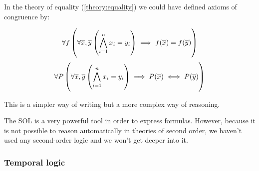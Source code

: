 In the theory of equality (\ref{theory:equality}) we could have defined axioms of congruence by:

\[\forall f \left( \forall \overline{x},\overline{y} \left( \bigwedge_{i=1}^n x_i = y_i \right) \implies f(\overline{x}) = f(\overline{y}) \right)\]
\[\forall P \left( \forall \overline{x},\overline{y} \left( \bigwedge_{i=1}^n x_i = y_i \right) \implies P(\overline{x}) \iff P(\overline{y}) \right)\]

This is a simpler way of writing but a more complex way of reasoning.

The \gls{SOL} is a very powerful tool in order to express formulas. 
%
However, because it is not possible to reason automatically in theories of second order, we haven't used any second-order logic and we won't get deeper into it. 


\subsubsection{Temporal logic}

